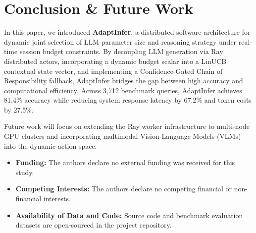 \documentclass[pdflatex,sn-mathphys-num]{sn-jnl}%
\theoremstyle{thmstyleone}%
\theoremstyle{thmstyletwo}%
\theoremstyle{thmstylethree}%
\begin{document}
\section{Conclusion \& Future Work}\label{sec6}

In this paper, we introduced \textbf{AdaptInfer}, a distributed software architecture for dynamic joint selection of LLM parameter size and reasoning strategy under real-time session budget constraints. By decoupling LLM generation via Ray distributed actors, incorporating a dynamic budget scalar into a LinUCB contextual state vector, and implementing a Confidence-Gated Chain of Responsibility fallback, AdaptInfer bridges the gap between high accuracy and computational efficiency. Across 3,712 benchmark queries, AdaptInfer achieves 81.4\% accuracy while reducing system response latency by 67.2\% and token costs by 27.5\%.

Future work will focus on extending the Ray worker infrastructure to multi-node GPU clusters and incorporating multimodal Vision-Language Models (VLMs) into the dynamic action space.

\backmatter

\begin{itemize}
    \item \textbf{Funding:} The authors declare no external funding was received for this study.
    \item \textbf{Competing Interests:} The authors declare no competing financial or non-financial interests.
    \item \textbf{Availability of Data and Code:} Source code and benchmark evaluation datasets are open-sourced in the project repository.
\end{itemize}


\end{document}
